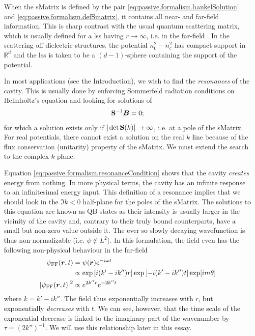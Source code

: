 When the \gls{sMatrix} is defined by the pair \eqref{eq:passive.formalism.hankelSolution}
and \eqref{eq:passive.formalism.defSmatrix}, it contains all near- and
far-field information. This is sharp contrast with the usual quantum 
scattering matrix, which is usually defined for a \gls{lss} having 
$r\rightarrow\infty$, i.e. in the far-field \cite{ROD1967,JOA1975,NEW1982}. In the scattering off dielectric structures, the potential 
$n_0^2-n_c^2$ has compact support in $\mathbb{R}^d$ and the \gls{lss} is taken to be 
a $(d-1)$-sphere containing the support of the potential.

In most applications (see the Introduction), we wish to find the \textit{resonances} of the
cavity. This is usually done by enforcing Sommerfeld radiation conditions
on Helmholtz's equation and looking for solutions of
  \begin{equation}
   \label{eq:passive.formalism.resonanceCondition}
   \mathbf{S}^{-1}\boldsymbol{B}=0;
  \end{equation}
for which a solution exists only if $|\det{\mathbf{S}(k)}|\rightarrow\infty$, 
i.e. at a pole of the \gls{sMatrix}. 
For real potentials, there cannot exist a solution on the real $k$ line because
of the flux conservation (unitarity) property of the \gls{sMatrix}. We 
must extend the search to the complex $k$ plane.

Equation \eqref{eq:passive.formalism.resonanceCondition} shows that the cavity 
\textit{creates} energy from nothing. In more physical terms, the cavity
has an infinite response to an infinitesimal energy input. This definition
of a resonance implies that we should look in the $\Im{k}<0$ half-plane
for the poles of the \gls{sMatrix}. The solutions to this equation 
are known as QB states as their intensity is usually larger
in the vicinity of the cavity and, contrary to their truly bound counterparts, 
have a small but non-zero value outside it. The ever so slowly decaying wavefunction
is thus non-normalizable (i.e. $\psi\notin L^2$). In this formulation, the field even
has the following non-physical behaviour in the far-field
  \begin{align*}
   \psi_\text{FF}(\boldsymbol{r},t) 			&= \psi(\boldsymbol{r})e^{-i\omega t}	\\
						&\propto \exp\left[i(k'-ik'')r\right]\exp\left[-i(k'-ik'')t\right]\exp[im\theta]	\\
   \left|\psi_\text{FF}(\boldsymbol{r},t)\right|^2 	&\propto e^{2k''r}e^{-2k''t} 
  \end{align*}
where $k=k'-ik''$. The field thus exponentially increases with $r$, 
but exponentially \textit{decreases} with $t$. We can see, however, 
that the time scale of the exponential decrease is linked to the
imaginary part of the wavenumber by $\tau=\left(2k''\right)^{-1}$.
We will use this relationship later in this essay.

